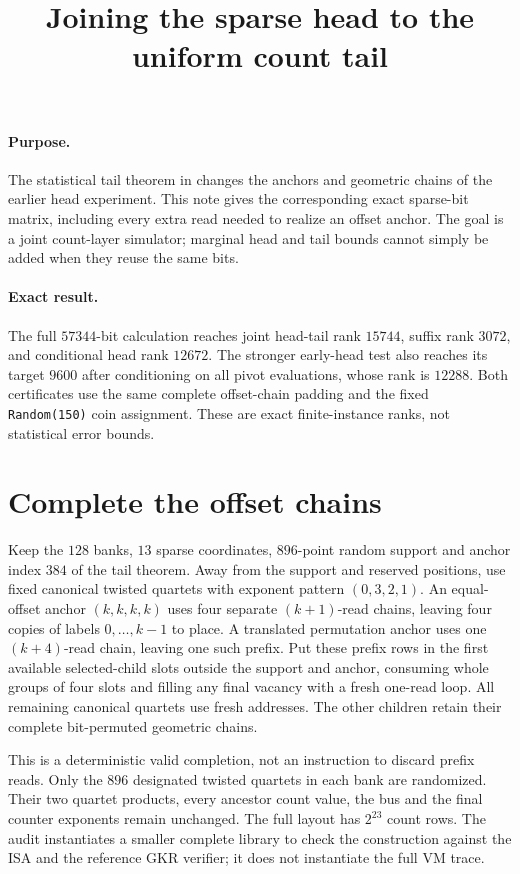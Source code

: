 \documentclass[11pt]{article}
\title{Joining the sparse head to the uniform count tail}
\author{}
\date{}
\begin{document}
\maketitle
\vspace{-2em}

\paragraph{Purpose.} The statistical tail theorem in  changes the anchors and geometric chains of the earlier head experiment. This note gives the corresponding exact sparse-bit matrix, including every extra read needed to realize an offset anchor. The goal is a joint count-layer simulator; marginal head and tail bounds cannot simply be added when they reuse the same bits.

\paragraph{Exact result.} The full $57344$-bit calculation reaches joint head-tail rank $15744$, suffix rank $3072$, and conditional head rank $12672$. The stronger early-head test also reaches its target $9600$ after conditioning on all pivot evaluations, whose rank is $12288$. Both certificates use the same complete offset-chain padding and the fixed \texttt{Random(150)} coin assignment. These are exact finite-instance ranks, not statistical error bounds.

\section{Complete the offset chains}

Keep the $128$ banks, $13$ sparse coordinates, $896$-point random support and anchor index $384$ of the tail theorem. Away from the support and reserved positions, use fixed canonical twisted quartets with exponent pattern $(0,3,2,1)$. An equal-offset anchor $(k,k,k,k)$ uses four separate $(k+1)$-read chains, leaving four copies of labels $0,\ldots,k-1$ to place. A translated permutation anchor uses one $(k+4)$-read chain, leaving one such prefix. Put these prefix rows in the first available selected-child slots outside the support and anchor, consuming whole groups of four slots and filling any final vacancy with a fresh one-read loop. All remaining canonical quartets use fresh addresses. The other children retain their complete bit-permuted geometric chains.

This is a deterministic valid completion, not an instruction to discard prefix reads. Only the $896$ designated twisted quartets in each bank are randomized. Their two quartet products, every ancestor count value, the bus and the final counter exponents remain unchanged. The full layout has $2^{23}$ count rows. The audit instantiates a smaller complete library to check the construction against the ISA and the reference GKR verifier; it does not instantiate the full VM trace.
\end{document}
